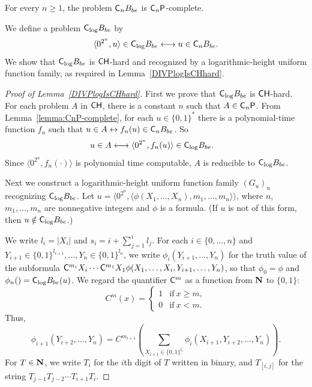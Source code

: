 \begin{lemma} \label{lemma:CnP-complete}
 For every $n \ge 1$, 
 the problem $\mathsf{C}_n B_{be}$ is $\mathsf{C}_n\mathsf{P}$-complete.
\end{lemma}

We define a problem $\mathsf{C}_{\log} B_{be}$ by
\begin{equation}
 \langle 0^{2^n}, u \rangle \in \mathsf{C}_{\log} B_{be}
 \longleftrightarrow
 u \in \mathsf{C}_n B_{be}.
\end{equation}
We show that $\mathsf{C}_{\log} B_{be}$ 
is $\mathsf{CH}$-hard and recognized by a logarithmic-height uniform function family,
as required in Lemma~\ref{DIVPlogIsCHhard}. 

\begin{proof}[\textup{Proof of Lemma~\ref{DIVPlogIsCHhard}}]
First we prove that $\mathsf{C}_{\log} B_{be}$ is $\mathsf{CH}$-hard.
For each problem $A$ in $\mathsf{CH}$, there is a constant $n$ such that $A \in \mathsf{C}_n \mathsf{P}$.
From Lemma~\ref{lemma:CnP-complete}, for each $u \in \{0,1\}^*$
there is a polynomial-time function $f_n$ such that
$u \in A \leftrightarrow f_n(u) \in \mathsf{C}_n B_{be}$. So
\begin{align}
 u \in A 
 & \longleftrightarrow \langle 0^{2^n}, f_n(u) \rangle \in \mathsf{C}_{\log} B_{be}.
\end{align}
Since $\langle 0^{2^n}, f_n(\cdot) \rangle$ is polynomial time computable,
$A$ is reducible to $\mathsf{C}_{\log} B_{be}$.


Next we construct a logarithmic-height uniform function family $(G_u)_u$
recognizing $\mathsf{C}_{\log} B_{be}$.
Let $u  = \langle 0^{2^n}, 
\langle \phi(X_1, \dots, X_n), m_1, \dots, m_n \rangle \rangle$, 
where $n$, $m_1, \dots, m_n$ are nonnegative integers 
and $\phi$ is a formula. 
(If $u$ is not of this form, then $u \notin \mathsf{C}_{\log} B_{be}$.)
 
We write $l_i = |X_i|$ and $s_i = i + \sum^i_{j=1}l_j$.
For each $i \in \{0, \dots, n\}$ and
$Y_{i+1} \in \{0,1\}^{l_{i+1}}, \dots, Y_n \in \{0,1\}^{l_n}$,
we write $\phi_i(Y_{i+1}, \dots, Y_n)$ for the truth value of the subformula
$\mathsf{C}^{m_{i}}{X_i} \cdots \mathsf{C}^{m_1}{X_1} \phi(X_1, \dots, X_i, Y_{i+1}, \dots, Y_n)$,
so that $\phi_0 = \phi$ and $\phi_n() = \mathsf{C}_{\log} B_{be} (u)$.
We regard the quantifier $\mathsf{C}^m$ as a function from $\mathbf N$ to $\{0,1\}$:
\begin{equation}
 C^m(x) 
  = \begin{cases}
     1 & \text{if} \ x \ge m, \\
     0 & \text{if} \ x < m.
    \end{cases}
\end{equation}
Thus,
\begin{equation} \label{eq:phi-step}
 \phi_{i+1}(Y_{i+2}, \dots, Y_n) 
  = C^{m_{i+1}}\left(\sum_{X_{i+1} \in \{ 0,1 \} ^{l_i}}
		\phi_i(X_{i+1}, Y_{i+2}, \dots, Y_{n})\right).
\end{equation}
For $T \in \mathbf N$, we write $T_i$ for the $i$th digit of $T$ written in binary,
and $T_{[i,j]}$ for the string $T_{j-1} T_{j-2} \cdots T_{i+1} T_{i}$.


\end{proof}
